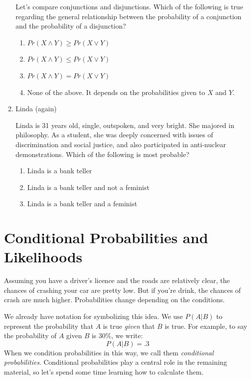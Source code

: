 \documentclass[]{tufte-book}
\providecommand{\tightlist}{%
  \setlength{\itemsep}{0pt}\setlength{\parskip}{0pt}}
\begin{document}
\begin{enumerate}
  Let's compare conjunctions and disjunctions. Which of the following is true regarding the general relationship between the probability of a conjunction and the probability of a disjunction?

  \begin{enumerate}
  \def\labelenumii{\alph{enumii}.}
  \tightlist
  \item
    \(Pr(X\wedge Y)\geq Pr(X\vee Y)\)
  \item
    \(Pr(X\wedge Y)\leq Pr(X\vee Y)\)
  \item
    \(Pr(X\wedge Y) = Pr(X\vee Y)\)
  \item
    None of the above. It depends on the probabilities given to \(X\) and \(Y\).
  \end{enumerate}
\item
  Linda (again)

  Linda is 31 years old, single, outspoken, and very bright. She majored in philosophy. As a student, she was deeply concerned with issues of discrimination and social justice, and also participated in anti-nuclear demonstrations. Which of the following is most probable?

  \begin{enumerate}
  \def\labelenumii{\alph{enumii}.}
  \tightlist
  \item
    Linda is a bank teller
  \item
    Linda is a bank teller and not a feminist
  \item
    Linda is a bank teller and a feminist
  \end{enumerate}
\end{enumerate}

\hypertarget{conditional-probabilities-and-likelihoods}{%
\chapter{Conditional Probabilities and Likelihoods}\label{conditional-probabilities-and-likelihoods}}

Assuming you have a driver's licence and the roads are relatively clear, the chances of crashing your car are pretty low. But if you're drink, the chances of crash are much higher. Probabilities change depending on the conditions.

We already have notation for symbolizing this idea. We use \(P(A | B)\) to represent the probability that \(A\) is true \emph{given} that \(B\) is true. For example, to say the probability of \(A\) given \(B\) is 30\%, we write:
\[ P(A | B) = .3 \]
When we condition probabilities in this way, we call them \emph{conditional probabilities}. Conditional probabilities play a central role in the remaining material, so let's spend some time learning how to calculate them.
\end{document}
